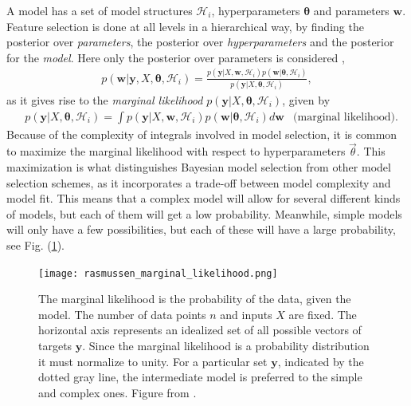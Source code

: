 \documentclass[twoside,english]{uiofysmaster}
\begin{document}
A model has a set of model structures $\mathcal{H}_i$, hyperparameters $\boldsymbol{\theta}$ and parameters $\textbf{w}$. Feature selection is done at all levels in a hierarchical way, by finding the  posterior over \textit{parameters}, the posterior over \textit{hyperparameters} and the posterior for the \textit{model}. Here only the posterior over parameters is considered \cite{rasmussen2006gaussian},
\begin{align}
p(\textbf{w}| \textbf{y}, X, \boldsymbol{\theta}, \mathcal{H}_i) = \frac{p(\textbf{y} | X, \textbf{w}, \mathcal{H}_i) p(\textbf{w}|\boldsymbol{\theta}, \mathcal{H}_i)}{p(\textbf{y}|X, \boldsymbol{\theta}, \mathcal{H}_i)},
\end{align}
as it gives rise to the \textit{marginal likelihood} $p(\textbf{y}|X, \boldsymbol{\theta}, \mathcal{H}_i)$, given by 
\begin{align}
&p(\textbf{y}|X, \boldsymbol{\theta}, \mathcal{H}_i) = \int p(\textbf{y} | X, \textbf{w}, \mathcal{H}_i)p(\textbf{w}| \boldsymbol{\theta}, \mathcal{H}_i) d \textbf{w} & \text{(marginal likelihood)}.
\end{align}
Because of the complexity of integrals involved in model selection, it is common to maximize the marginal likelihood with respect to hyperparameters $\vec{\theta}$. This maximization is what distinguishes Bayesian model selection from other model selection schemes, as it incorporates a trade-off between model complexity and model fit. This means that a complex model will allow for several different kinds of models, but each of them will get a low probability. Meanwhile, simple models will only have a few possibilities, but each of these will have a large probability, see Fig. (\ref{Fig:: gaussian process : Marginal likelihood Rasmussen}).

\begin{figure}
\centering
\texttt{[image: rasmussen\_marginal\_likelihood.png]}
\caption{The marginal likelihood is the probability of the data, given the model. The number of data points $n$ and inputs $X$ are fixed. The horizontal axis represents an idealized set of all possible vectors of targets $\textbf{y}$. Since the marginal likelihood is a probability distribution it must normalize to unity. For a particular set $\textbf{y}$, indicated by the dotted gray line, the intermediate model is preferred to the simple and complex ones. Figure from \cite{rasmussen2006gaussian}.}
\label{Fig:: gaussian process : Marginal likelihood Rasmussen}
\end{figure}
\end{document}
